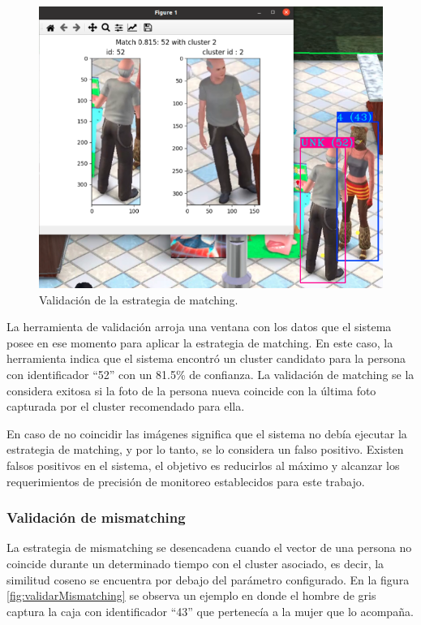 \begin{figure}[ht]
	\centering
	\includegraphics[scale=.7]{./Figures/validarMatching.png}
	\caption{Validación de la estrategia de matching.}
	\label{fig:validarMatching}
\end{figure}

La herramienta de validación arroja una ventana con los datos que el sistema posee en ese momento para aplicar la estrategia de matching. En este caso, la herramienta indica que el sistema encontró un cluster candidato para la persona con identificador ``52'' con un 81.5\% de confianza. La validación de matching se la considera exitosa si la foto de la persona nueva coincide con la última foto capturada por el cluster recomendado para ella. 

En caso de no coincidir las imágenes significa que el sistema no debía ejecutar la estrategia de matching, y por lo tanto, se lo considera un falso positivo. Existen falsos positivos en el sistema, el objetivo es reducirlos al máximo y alcanzar los requerimientos de precisión de monitoreo establecidos para este trabajo.

\newpage

\subsubsection{Validación de mismatching}

La estrategia de mismatching se desencadena cuando el vector de una persona no coincide durante un determinado tiempo con el cluster asociado, es decir, la similitud coseno se encuentra por debajo del parámetro configurado. En la figura \ref{fig:validarMismatching} se observa un ejemplo en donde el hombre de gris captura la caja con identificador ``43'' que pertenecía a la mujer que lo acompaña.

